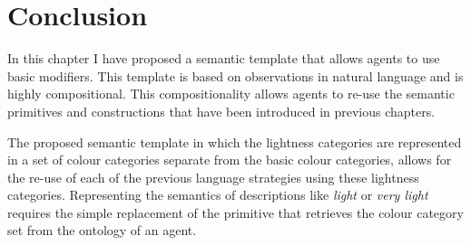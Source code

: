 \section{Conclusion}

In this chapter I have proposed a semantic template that allows
agents to use basic modifiers. This template is based on
observations in natural language and is highly compositional. This
compositionality allows agents to re-use the semantic primitives and
constructions that have been introduced in previous chapters.

The proposed semantic template in which the lightness categories are
represented in a set of colour categories separate from the
basic colour categories, allows for the re-use of each of the
previous language strategies using these lightness
categories. Representing the semantics of descriptions like \textit{light}
or \textit{very light} requires the simple replacement of the primitive that
retrieves the colour category set from the ontology of an agent.